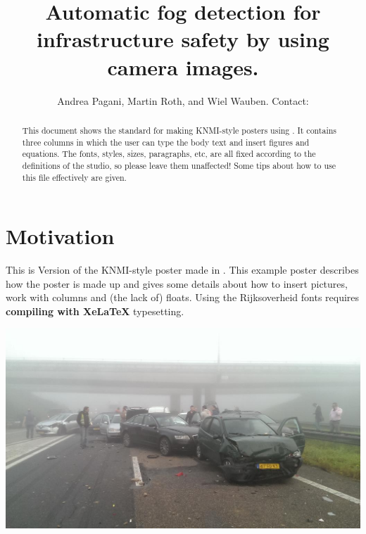 \documentclass{article}
\title{Automatic fog detection for infrastructure safety by using camera images.}
\author{Andrea Pagani\affil{1}, Martin Roth\affil{1}, and Wiel Wauben\affil{1}. Contact: \email{pagani@knmi.nl}}
\begin{document}
\maketitle

\begin{abstract}
This document shows the standard for making KNMI-style posters using \latex. It contains three columns in which the user can type the body text and insert figures and equations. The fonts, styles, sizes, paragraphs, etc, are all fixed according to the definitions of the studio, so please leave them unaffected! Some tips about how to use this file effectively are given. %
\end{abstract}

\bcols %

\section*{Motivation}
This is Version \fileversion of the KNMI-style poster made in \latex. This example poster describes how the poster is made up and gives some details about how to insert pictures, work with columns and (the lack of) floats.
Using the Rijksoverheid fonts requires \textbf{compiling with XeLaTeX} typesetting.

\vspace{20pt plus 10pt minus 5pt}
\begin{minipage}[b]{\columnwidth}
	\begin{center}
	\includegraphics[width=1.0\columnwidth]{Accident}
	\label{figAccident}
	\end{center}
\end{minipage}
\vspace{-1em}
\end{document}
